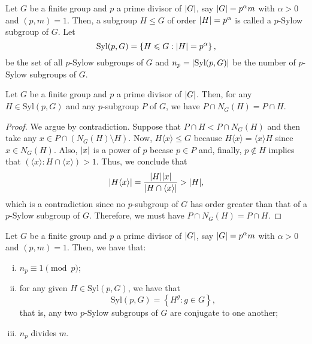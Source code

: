 \begin{definition}\label{def:p-sylow-subgroups}
  Let \(G\) be a finite group and \(p\) a prime divisor of \(\lvert G\rvert\), say \(\lvert G\rvert=p^{\alpha}m\) with \({\alpha}>{0}\) and \((p,m)=1\). Then, a subgroup \({H}\leqslant{G}\) of order \(\lvert H\rvert=p^{\alpha}\) is called a \(p\)-Sylow subgroup of \(G\). Let
  \[
    \text{Syl}(p,G)
    =
    \left\{{H}\leqslant{G}:\lvert H\rvert=p^{\alpha}\right\}
    ,
  \]
  be the set of all \(p\)-Sylow subgroups of \(G\) and \(n_{p}=\lvert\text{Syl}(p,G)\rvert\) be the number of \(p\)-Sylow subgroups of \(G\).
\end{definition}

\begin{lemma}\label{lem:normalizer-of-sylow-subgroups}
  Let \(G\) be a finite group and \(p\) a prime divisor of \(\lvert G\rvert\). Then,
  for any \({H}\in{\text{Syl}(p,G)}\) and any \(p\)-subgroup \(P\) of \(G\), we
  have \(P\cap{N_{G}(H)}=P\cap{H}\).
\end{lemma}

\begin{proof}
  We argue by contradiction. Suppose that \({P\cap{H}}<{P\cap{N_{G}(H)}}\) and then take any \({x}\in{P\cap{\left(N_{G}(H)\setminus{H}\right)}}\). Now, \({H\langle{x}\rangle}\leqslant{G}\) because \({H\langle{x}\rangle}=\langle{x}\rangle{H}\) since \({x}\in{N_{G}(H)}\). Also, \(\lvert x\rvert\) is a power of \(p\) becase \({p}\in{P}\) and, finally, \({p}\notin{H}\) implies that \({\left(\langle{x}\rangle:H\cap{\langle{x}\rangle}\right)}>{1}\). Thus, we conclude that
  \[
    \lvert H\langle{x}\rangle\rvert
    =
    \frac{\lvert H\rvert\lvert x\rvert}{\lvert H\cap{\langle{x}\rangle}\rvert}
    >
    \lvert H\rvert
    ,
  \]
  which is a contradiction since no \(p\)-subgroup of \(G\) has order greater than that of a \(p\)-Sylow subgroup of \(G\). Therefore, we must have \(P\cap{N_{G}(H)}=P\cap{H}\).
\end{proof}

\begin{theorem}\label{thm:second-sylow-theorem}
  Let \(G\) be a finite group and \(p\) a prime divisor of \(\lvert G\rvert\), say \(\lvert G\rvert=p^{\alpha}m\) with \({\alpha}>{0}\) and \((p,m)=1\). Then, we have that:
  \begin{enumerate}[i.]
    \item
      \(n_{p}\equiv{1}\pmod{p}\);
    \item
      for any given \({H}\in{\text{Syl}(p,G)}\), we have that
      \[
        \text{Syl}(p,G)
        =
        \left\{H^{g}:{g}\in{G}\right\}
        ,
      \]
      that is, any two \(p\)-Sylow subgroups of \(G\) are conjugate to one another;
    \item
      \(n_{p}\) divides \(m\).
  \end{enumerate}
\end{theorem}

